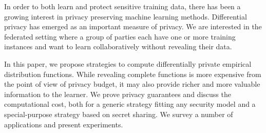 
In order to both learn and protect sensitive training data, there has been a growing interest in privacy preserving machine learning methods.  Differential privacy has emerged as an important measure of privacy.  We are interested in the federated setting where a group of parties each have one or more training instances and want to learn collaboratively without revealing their data.

In this paper, we propose strategies to compute differentially private empirical distribution functions.  While revealing complete functions is more expensive from the point of view of privacy budget, it may also provide richer and more valuable information to the learner.  We prove privacy guarantees and discuss the computational cost, both for a generic strategy fitting any security model and a special-purpose strategy based on secret sharing.  We survey a number of applications and present experiments.  


